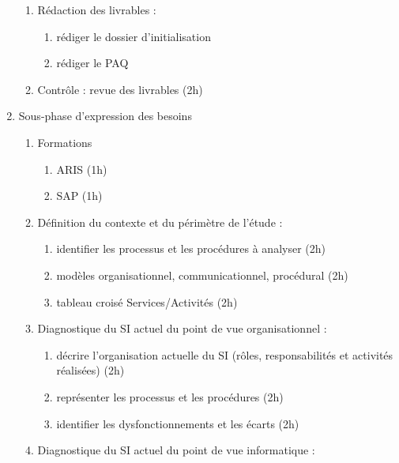 \begin{enumerate}
\begin{enumerate}
            \item Rédaction des livrables : 
                \begin{enumerate}
                  \item rédiger le dossier d'initialisation 
                  \item rédiger le PAQ 
                \end{enumerate}

            \item Contrôle : revue des livrables (2h)
          \end{enumerate}

    \item Sous-phase d'expression des besoins
          \begin{enumerate}
            \item Formations 
                \begin{enumerate}
                  \item ARIS (1h)
                  \item SAP (1h)
                \end{enumerate}
            \item Définition du contexte et du périmètre de l'étude :
                \begin{enumerate}
                  \item identifier les processus et les procédures à analyser (2h)
                  \item modèles organisationnel, communicationnel, procédural (2h)
                  \item tableau croisé Services/Activités (2h) 
                \end{enumerate}
            \item Diagnostique du SI actuel du point de vue organisationnel : 
                \begin{enumerate}
                  \item décrire l'organisation actuelle du SI (rôles, responsabilités et activités réalisées) (2h)
                  \item représenter les processus et les procédures (2h)
                  \item identifier les dysfonctionnements et les écarts (2h)
                \end{enumerate}
            \item Diagnostique du SI actuel du point de vue informatique : 
                \begin{enumerate}

\end{enumerate}
\end{enumerate}
\end{enumerate}
